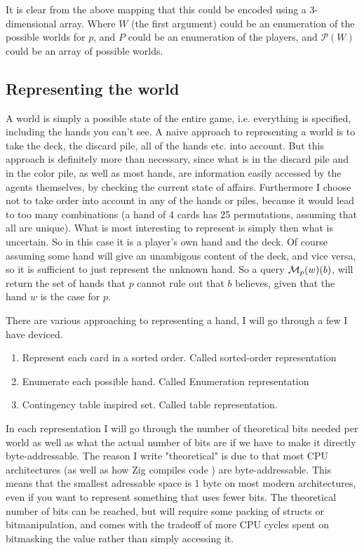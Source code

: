 It is clear from the above mapping that this could be encoded using a 3-dimensional array. Where $W$ (the first argument) could be an enumeration of the possible worlds for $p$, and $P$ could be an enumeration of the players, and $\mathcal{P}(W)$ could be an array of possible worlds.



\subsection{Representing the world} \label{sec:representing-a-world}
A world is simply a possible state of the entire game, i.e. everything is specified, including the hands you can't see. A naive approach to representing a world is to take the deck, the discard pile, all of the hands etc. into account. But this approach is definitely more than necessary, since what is in the discard pile and in the color pile, as well as most hands, are information easily accessed by the agents themselves, by checking the current state of affairs. Furthermore I choose not to take order into account in any of the hands or piles, because it would lead to too many combinations (a hand of 4 cards has 25 permutations, assuming that all are unique). What is most interesting to represent is simply then what is uncertain. So in this case it is a player's own hand and the deck. Of course assuming some hand will give an unambigous content of the deck, and vice versa, so it is sufficient to just represent the unknown hand. So a query $\mathcal{M}_p(w)(b)$, will return the set of hands that $p$ cannot rule out that $b$ believes, given that the hand $w$ is the case for $p$.

There are various approaching to representing a hand, I will go through a few I have deviced. 

\begin{enumerate}
\item Represent each card in a sorted order. Called sorted-order representation
\item Enumerate each possible hand. Called Enumeration representation
\item Contingency table inspired set. Called table representation.
\end{enumerate}

In each representation I will go through the number of theoretical bits needed per world as well as what the actual number of bits are if we have to make it directly byte-addressable. The reason I write "theoretical" is due to that most CPU architectures (as well as how Zig compiles code \cite{zigdocspackedstruct}) are byte-addressable. This means that the smallest adressable space is 1 byte on most modern architectures, even if you want to represent something that uses fewer bits. The theoretical number of bits can be reached, but will require some packing of structs or bitmanipulation, and comes with the tradeoff of more CPU cycles spent on bitmasking the value rather than simply accessing it. 


